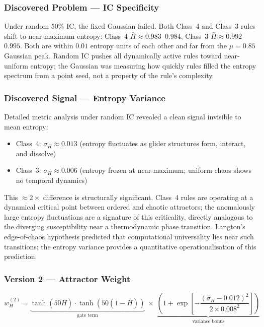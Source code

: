 \documentclass[12pt,a4paper]{article}
\begin{document}
\subsubsection*{Discovered Problem --- IC Specificity}

Under random 50\% IC, the fixed Gaussian failed.
Both Class~4 and Class~3 rules shift to near-maximum entropy:
Class~4 $\bar{H} \approx 0.983$--$0.984$, Class~3 $\bar{H} \approx 0.992$--$0.995$.
Both are within $0.01$ entropy units of each other and far from the
$\mu = 0.85$ Gaussian peak.
Random IC pushes all dynamically active rules toward near-uniform entropy;
the Gaussian was measuring how quickly rules filled the entropy spectrum from
a point seed, not a property of the rule's complexity.

\subsubsection*{Discovered Signal --- Entropy Variance}

Detailed metric analysis under random IC revealed a clean signal invisible
to mean entropy:
\begin{itemize}[noitemsep]
  \item Class~4: $\sigma_H \approx 0.013$
    (entropy fluctuates as glider structures form, interact, and dissolve)
  \item Class~3: $\sigma_H \approx 0.006$
    (entropy frozen at near-maximum; uniform chaos shows no temporal dynamics)
\end{itemize}
This $\approx 2\times$ difference is structurally significant.
Class~4 rules are operating at a dynamical critical point between ordered
and chaotic attractors; the anomalously large entropy fluctuations are a
signature of this criticality, directly analogous to the diverging
susceptibility near a thermodynamic phase transition.
Langton's edge-of-chaos hypothesis \citep{langton1990} predicted that
computational universality lies near such transitions; the entropy variance
provides a quantitative operationalisation of this prediction.

\subsubsection*{Version 2 --- Attractor Weight}

\begin{equation}
w_H^{(2)} =
\underbrace{\tanh(50\bar{H}) \cdot \tanh\!\left(50(1 - \bar{H})\right)}_{\text{gate term}}
\;\times\;
\underbrace{\left(1 + \exp\!\left[
  -\frac{(\sigma_H - 0.012)^2}{2 \times 0.008^2}
\right]\right)}_{\text{variance bonus}}
\end{equation}
\end{document}
